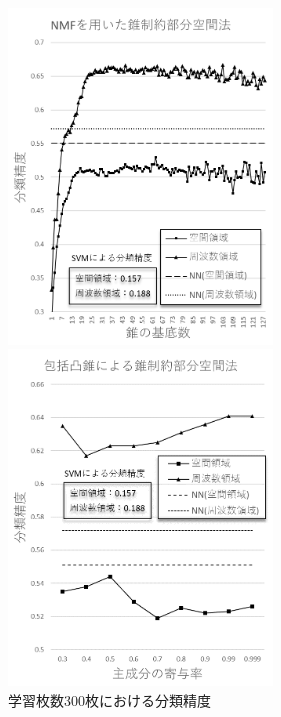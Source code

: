 \begin{figure}[htbp]
	\begin{minipage}{0.5\hsize}
		\begin{center}
			\includegraphics[width=70mm]{result/300-nmf.png}
		\end{center}
	\end{minipage}
	\begin{minipage}{0.5\hsize}
		\begin{center}
			\includegraphics[width=70mm]{result/300-comp.png}
		\end{center}
	\end{minipage}
	\caption{学習枚数300枚における分類精度}
\end{figure}

